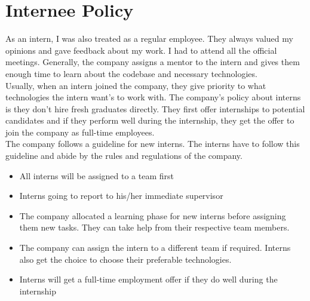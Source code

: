 \section{Internee Policy}
\begin{flushleft}
    As an intern, I was also treated as a regular employee. They always valued my opinions and
gave feedback about my work. I had to attend all the official meetings. Generally, the company
assigns a mentor to the intern and gives them enough time to learn about the codebase and
necessary technologies.\\
\vspace{6pt}
Usually, when an intern joined the company, they give priority to what technologies the intern
want’s to work with. The company’s policy about interns is they don’t hire fresh graduates
directly. They first offer internships to potential candidates and if they perform well during the
internship, they get the offer to join the company as full-time employees.\\
\vspace{6pt}
The company follows a guideline for new interns. The interns have to follow this guideline and
abide by the rules and regulations of the company.

\begin{itemize}
    \item All interns will be assigned to a team first\\
 \item Interns going to report to his/her immediate supervisor\\
 \item The company allocated a learning phase for new interns before assigning them new
tasks. They can take help from their respective team members.\\
 \item The company can assign the intern to a different team if required. Interns also get the
choice to choose their preferable technologies.\\
 \item Interns will get a full-time employment offer if they do well during the internship
\end{itemize}

\end{flushleft}